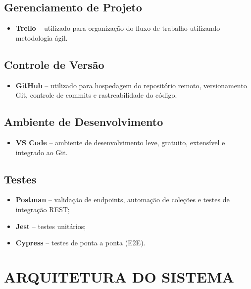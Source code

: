 \documentclass[12pt,a4paper]{article}
\begin{document}
\subsection*{Gerenciamento de Projeto}

\begin{itemize}
    \item \textbf{Trello} -- utilizado para organização do fluxo de
    trabalho utilizando metodologia ágil.
\end{itemize}

\subsection*{Controle de Versão}

\begin{itemize}
    \item \textbf{GitHub} -- utilizado para hospedagem do repositório
    remoto, versionamento Git, controle de commits e rastreabilidade
    do código.
\end{itemize}

\subsection*{Ambiente de Desenvolvimento}

\begin{itemize}
    \item \textbf{VS Code} -- ambiente de desenvolvimento leve,
    gratuito, extensível e integrado ao Git.
\end{itemize}

\subsection*{Testes}

\begin{itemize}
    \item \textbf{Postman} -- validação de endpoints, automação de
    coleções e testes de integração REST;
    \item \textbf{Jest} -- testes unitários;
    \item \textbf{Cypress} -- testes de ponta a ponta (E2E).
\end{itemize}


\section*{ARQUITETURA DO SISTEMA}
\end{document}
